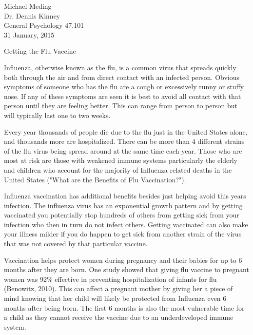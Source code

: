 \documentclass[12pt]{article}
\begin{document}
\begin{flushleft}

Michael Meding\\
Dr. Dennis Kinney\\
General Psychology 47.101\\
31 January, 2015\\


\begin{center}
Getting the Flu Vaccine
\end{center}


\setlength{\parindent}{0.5in}

Influenza, otherwise known as the flu, is a common virus that spreads quickly both through the air and from direct contact with an infected person. Obvious symptoms of someone who has the flu are a cough or excessively runny or stuffy nose. If any of these symptoms are seen it is best to avoid all contact with that person until they are feeling better. This can range from person to person but will typically last one to two weeks.

Every year thousands of people die due to the flu just in the United States alone, and thousands more are hospitalized. There can be more than 4 different strains of the flu virus being spread around at the same time each year. Those who are most at risk are those with weakened immune systems particularly the elderly and children who account for the majority of Influenza related deaths in the United States ("What are the Benefits of Flu Vaccination?"). 

Influenza vaccination has additional benefits besides just helping avoid this years infection. The influenza virus has an exponential growth pattern and by getting vaccinated you potentially stop hundreds of others from getting sick from your infection who then in turn do not infect others. Getting vaccinated can also make your illness milder if you do happen to get sick from another strain of the virus that was not covered by that particular vaccine.

Vaccination helps protect women during pregnancy and their babies for up to 6 months after they are born. One study showed that giving flu vaccine to pregnant women was 92\% effective in preventing hospitalization of infants for flu (Benowitz, 2010). This can affect a pregnant mother by giving her a piece of mind knowing that her child will likely be protected from Influenza even 6 months after being born. The first 6 months is also the most vulnerable time for a child as they cannot receive the vaccine due to an underdeveloped immune system. 


\end{flushleft}
\end{document}
